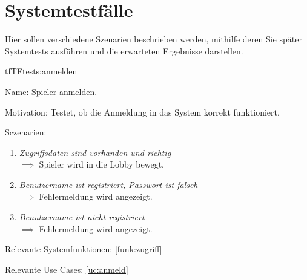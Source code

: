 \chapter{Systemtestfälle}

Hier sollen verschiedene Szenarien beschrieben werden, mithilfe deren Sie später Systemtests ausführen und die erwarteten Ergebnisse darstellen.

\setcounter{tf}{10}

\begin{description}[leftmargin=5em, style=sameline]

\begin{lhp}{tf}{TF}{tests:anmelden}
	\item [Name:] Spieler anmelden.
	\item [Motivation:] Testet, ob die Anmeldung in das System korrekt funktioniert.
	\item [Sczenarien:] \hfill
		\begin{enumerate}
			\item \textit{Zugriffsdaten sind vorhanden und richtig} \\ $\implies$ Spieler wird in die Lobby bewegt.
			\item \textit{Benutzername ist registriert, Passwort ist falsch} \\ $\implies$ Fehlermeldung wird angezeigt.
			\item \textit{Benutzername ist nicht registriert} \\ $\implies$ Fehlermeldung wird angezeigt.
		\end{enumerate}
	\item [Relevante Systemfunktionen:] \ref{funk:zugriff}
	\item [Relevante Use Cases:] \ref{uc:anmeld}
\end{lhp}

\end{description}


